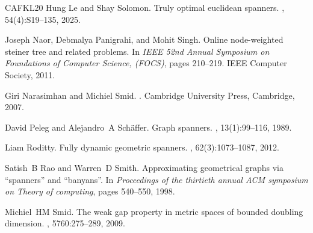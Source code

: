 \documentclass[11pt]{article}
\begin{document}
\begin{thebibliography}{CAFKL20}
Hung Le and Shay Solomon.
\newblock Truly optimal euclidean spanners.
, 54(4):S19--135, 2025.

Joseph Naor, Debmalya Panigrahi, and Mohit Singh.
\newblock Online node-weighted steiner tree and related problems.
\newblock In {\em {IEEE} 52nd Annual Symposium on Foundations of Computer
  Science, (FOCS)}, pages 210--219. {IEEE} Computer Society, 2011.

Giri Narasimhan and Michiel Smid.
.
\newblock Cambridge University Press, Cambridge, 2007.

David Peleg and Alejandro~A Sch{\"a}ffer.
\newblock Graph spanners.
, 13(1):99--116, 1989.

Liam Roditty.
\newblock Fully dynamic geometric spanners.
, 62(3):1073--1087, 2012.

Satish~B Rao and Warren~D Smith.
\newblock Approximating geometrical graphs via “spanners” and
  “banyans”.
\newblock In {\em Proceedings of the thirtieth annual ACM symposium on Theory
  of computing}, pages 540--550, 1998.

Michiel~HM Smid.
\newblock The weak gap property in metric spaces of bounded doubling dimension.
, 5760:275--289, 2009.

\end{thebibliography}
\end{document}
